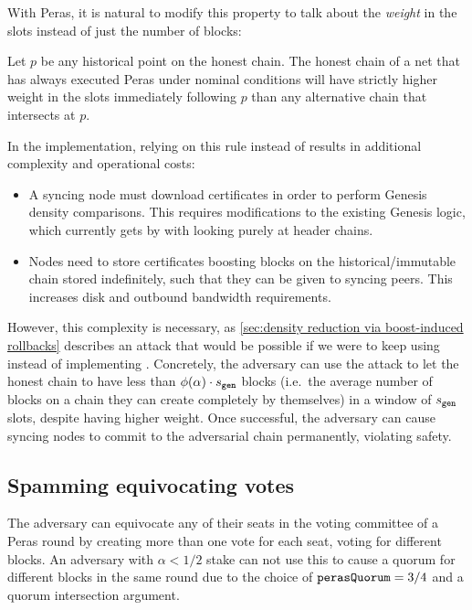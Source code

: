 \medskip
With Peras, it is natural to modify this property to talk about the \emph{weight} in the \sgen{} slots instead of just the number of blocks:
\begin{tcolorbox}[title=\weightedDensityOfCompetingChainsName]\label{property:weighted-density-of-competing-chains}
  Let $p$ be any historical point on the honest chain. The honest chain of a net that has always executed Peras under nominal conditions will have strictly higher weight in the \sgen{} slots immediately following $p$ than any alternative chain that intersects at $p$.
\end{tcolorbox}
In the implementation, relying on this rule instead of \densityOfCompetingChains{} results in additional complexity and operational costs:
\begin{itemize}
\item A syncing node must download certificates in order to perform Genesis density comparisons.
  This requires modifications to the existing Genesis logic, which currently gets by with looking purely at header chains.
\item Nodes need to store certificates boosting blocks on the historical/immutable chain stored indefinitely, such that they can be given to syncing peers.
  This increases disk and outbound bandwidth requirements.
\end{itemize}
However, this complexity is necessary, as \cref{sec:density reduction via boost-induced rollbacks} describes an attack that would be possible if we were to keep using \densityOfCompetingChains{} instead of implementing \weightedDensityOfCompetingChains{}.
Concretely, the adversary can use the attack to let the honest chain to have less than $\phi(\alpha) \cdot s_{\mathtt{gen}}$ blocks (i.e.\ the average number of blocks on a chain they can create completely by themselves) in a window of $s_{\mathtt{gen}}$ slots, despite having higher weight.
Once successful, the adversary can cause syncing nodes to commit to the adversarial chain permanently, violating safety.

\subsection{Spamming equivocating votes}

The adversary can equivocate any of their seats in the voting committee of a Peras round by creating more than one vote for each seat, voting for different blocks.
An adversary with $\alpha<1/2$ stake can not use this to cause a quorum for different blocks in the same round due to the choice of $\mathtt{perasQuorum} = 3/4$ and a quorum intersection argument.

